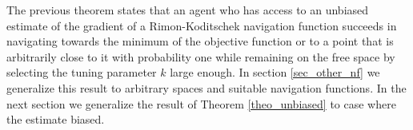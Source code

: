 \documentclass[article]{IEEEtran}
\theoremstyle{definition}
\begin{document}
The previous theorem states that an agent who has access to an unbiased estimate of the gradient of a Rimon-Koditschek navigation function succeeds in navigating towards the minimum of the objective function or to a point that is arbitrarily close to it with probability one while remaining on the free space by selecting the tuning parameter $k$ large enough. In section \ref{sec_other_nf} we generalize this result to arbitrary spaces and suitable navigation functions. In the next section we generalize the result of Theorem \ref{theo_unbiased} to case where the estimate biased.
%
\end{document}
